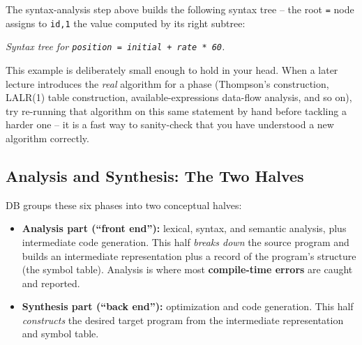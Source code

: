 \documentclass[full-course-notes.tex]{subfiles}
\begin{document}
The syntax-analysis step above builds the following syntax tree -- the root \texttt{=} node
assigns to \texttt{id,1} the value computed by its right subtree:

\begin{center}
\end{center}
\begin{center}
\small\textit{Syntax tree for \texttt{position = initial + rate * 60}.}
\end{center}

\begin{examfocus}
This example is deliberately small enough to hold in your head. When a later lecture introduces
the \emph{real} algorithm for a phase (Thompson's construction, LALR(1) table construction,
available-expressions data-flow analysis, and so on), try re-running that algorithm on this same
statement by hand before tackling a harder one -- it is a fast way to sanity-check that you have
understood a new algorithm correctly.
\end{examfocus}

\subsection{Analysis and Synthesis: The Two Halves}
\label{sec:l2-analysis-synthesis}

\dbtag DB groups these six phases into two conceptual halves:

\begin{itemize}
  \item \textbf{Analysis part (``front end''):} lexical, syntax, and semantic analysis, plus
  intermediate code generation. This half \emph{breaks down} the source program and builds an
  intermediate representation plus a record of the program's structure (the symbol table).
  Analysis is where most \textbf{compile-time errors} are caught and reported.
  \item \textbf{Synthesis part (``back end''):} optimization and code generation. This half
  \emph{constructs} the desired target program from the intermediate representation and symbol
  table.
\end{itemize}
\end{document}
